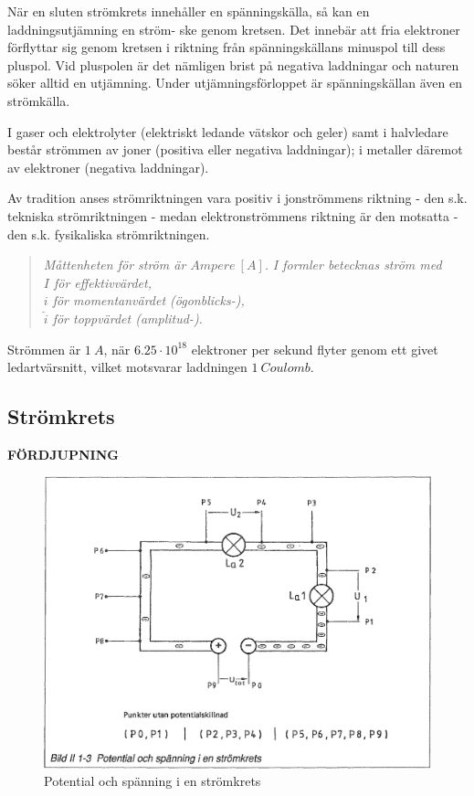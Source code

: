 När en sluten strömkrets innehåller en spänningskälla, så kan en
laddningsutjämning en ström- ske genom kretsen. Det innebär att fria elektroner
förflyttar sig genom kretsen i riktning från spänningskällans minuspol till
dess pluspol. Vid pluspolen är det nämligen brist på negativa laddningar och
naturen söker alltid en utjämning. Under utjämningsförloppet är spänningskällan
även en strömkälla.

I gaser och elektrolyter (elektriskt ledande vätskor och geler) samt i
halvledare består strömmen av joner (positiva eller negativa laddningar);
i metaller däremot av elektroner (negativa laddningar).

Av tradition anses strömriktningen vara positiv i jonströmmens riktning - den
s.k. tekniska strömriktningen - medan elektronströmmens riktning är den
motsatta - den s.k. fysikaliska strömriktningen.

\begin{quote}
\emph{Måttenheten för ström är \(Ampere\ [A]\).}
\emph{I formler betecknas ström med} \\
\emph{\(I\) för effektivvärdet,} \\
\emph{\(i\) för momentanvärdet (ögonblicks-),} \\
\emph{\(\hat{i}\) för toppvärdet (amplitud-).}
\end{quote}

Strömmen är \(1\ A\), när \(6.25 \cdot 10^{18}\) elektroner per sekund flyter genom ett givet
ledartvärsnitt, vilket motsvarar laddningen \(1\ Coulomb\).

\subsection{Strömkrets}
\textbf{FÖRDJUPNING}

\begin{figure}
\begin{center}
\includegraphics[width=\textwidth]{images/bild_2_1-03}
\caption{Potential och spänning i en strömkrets}
\label{fig:BildII1-3}
\end{center}
\end{figure}

